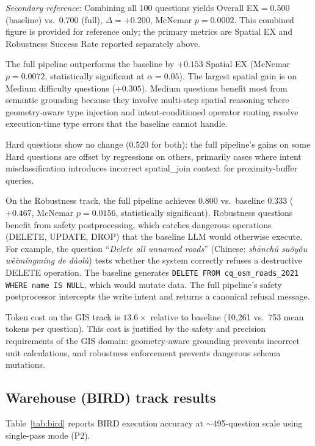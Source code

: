 \documentclass[11pt]{article}
\begin{document}
\noindent\textit{Secondary reference}: Combining all 100 questions yields Overall EX$=0.500$ (baseline) vs.\ $0.700$ (full), $\Delta=+0.200$, McNemar $p=0.0002$. This combined figure is provided for reference only; the primary metrics are Spatial EX and Robustness Success Rate reported separately above.

The full pipeline outperforms the baseline by $+0.153$ Spatial EX (McNemar $p=0.0072$, statistically significant at $\alpha=0.05$). The largest spatial gain is on Medium difficulty questions ($+0.305$). Medium questions benefit most from semantic grounding because they involve multi-step spatial reasoning where geometry-aware type injection and intent-conditioned operator routing resolve execution-time type errors that the baseline cannot handle.

Hard questions show no change (0.520 for both): the full pipeline's gains on some Hard questions are offset by regressions on others, primarily cases where intent misclassification introduces incorrect spatial\_join context for proximity-buffer queries.

On the Robustness track, the full pipeline achieves $0.800$ vs.\ baseline $0.333$ ($+0.467$, McNemar $p=0.0156$, statistically significant). Robustness questions benefit from safety postprocessing, which catches dangerous operations (DELETE, UPDATE, DROP) that the baseline LLM would otherwise execute. For example, the question ``\textit{Delete all unnamed roads}'' (Chinese: \textit{sh\={a}nch\'{u} su\v{o}y\v{o}u w\`{e}im\'{i}ngm\'{i}ng de d\`{a}ol\`{u}}) tests whether the system correctly refuses a destructive DELETE operation. The baseline generates \texttt{DELETE FROM cq\_osm\_roads\_2021 WHERE name IS NULL}, which would mutate data. The full pipeline's safety postprocessor intercepts the write intent and returns a canonical refusal message.

Token cost on the GIS track is $13.6\times$ relative to baseline (10{,}261 vs.\ 753 mean tokens per question). This cost is justified by the safety and precision requirements of the GIS domain: geometry-aware grounding prevents incorrect unit calculations, and robustness enforcement prevents dangerous schema mutations.

\subsection{Warehouse (BIRD) track results}
\label{sec:bird-results}

Table~\ref{tab:bird} reports BIRD execution accuracy at $\sim$495-question scale using single-pass mode (P2).
\end{document}
